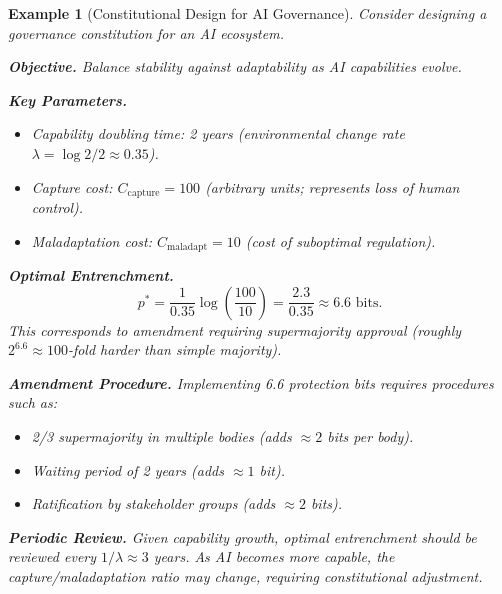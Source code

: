 \documentclass[12pt]{article}
\newtheorem{example}[theorem]{Example}
\begin{document}
\begin{example}[Constitutional Design for AI Governance]
\label{ex:constitutional-design}
Consider designing a governance constitution for an AI ecosystem.

\textbf{Objective.} Balance stability against adaptability as AI capabilities evolve.

\textbf{Key Parameters.}
\begin{itemize}
    \item Capability doubling time: 2 years (environmental change rate $\lambda = \log 2 / 2 \approx 0.35$).
    \item Capture cost: $C_{\text{capture}} = 100$ (arbitrary units; represents loss of human control).
    \item Maladaptation cost: $C_{\text{maladapt}} = 10$ (cost of suboptimal regulation).
\end{itemize}

\textbf{Optimal Entrenchment.}
\[
p^* = \frac{1}{0.35} \log \left( \frac{100}{10} \right) = \frac{2.3}{0.35} \approx 6.6 \text{ bits}.
\]
This corresponds to amendment requiring supermajority approval (roughly $2^{6.6} \approx 100$-fold harder than simple majority).

\textbf{Amendment Procedure.}
Implementing 6.6 protection bits requires procedures such as:
\begin{itemize}
    \item 2/3 supermajority in multiple bodies (adds $\approx 2$ bits per body).
    \item Waiting period of 2 years (adds $\approx 1$ bit).
    \item Ratification by stakeholder groups (adds $\approx 2$ bits).
\end{itemize}

\textbf{Periodic Review.}
Given capability growth, optimal entrenchment should be reviewed every $1/\lambda \approx 3$ years. As AI becomes more capable, the capture/maladaptation ratio may change, requiring constitutional adjustment.
\end{example}
\end{document}
